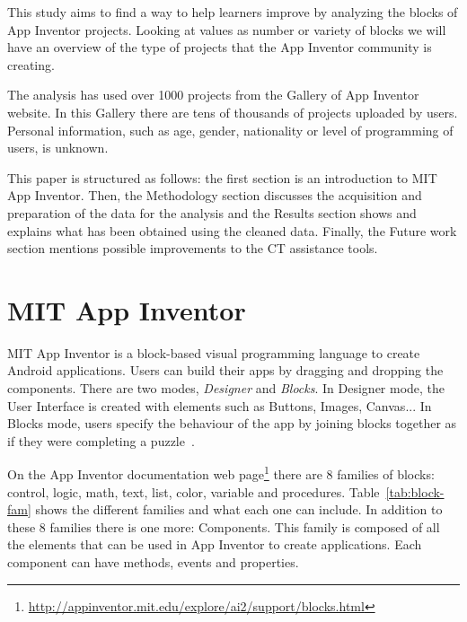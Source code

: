 \documentclass[a4paper]{article}
\begin{document}
This study aims to find a way to help learners improve by analyzing the blocks of App Inventor projects. Looking at values as number or variety of blocks we will have an overview of the type of projects that the App Inventor community is creating.

The analysis has used over 1000 projects from the Gallery of App Inventor website. In this Gallery there are tens of thousands of projects uploaded by users. Personal information, such as age, gender, nationality or level of programming of users, is unknown.

This paper is structured as follows: the first section is an introduction to MIT App Inventor. Then, the Methodology section discusses the acquisition and preparation of the data for the analysis and the Results section shows and explains what has been obtained using the cleaned data. Finally, the Future work section mentions possible improvements to the CT assistance tools.

\section{MIT App Inventor}
MIT App Inventor is a block-based visual programming language to create Android applications. Users can build their apps by dragging and dropping the components. There are two modes, \emph{Designer} and \emph{Blocks}. In Designer mode, the User Interface is created with elements such as Buttons, Images, Canvas... In Blocks mode, users specify the behaviour of the app by joining blocks together as if they were completing a puzzle~\cite{wolber2011app}.

On the App Inventor documentation web page\footnote{\url{http://appinventor.mit.edu/explore/ai2/support/blocks.html}} there are 8 families of blocks: control, logic, math, text, list, color, variable and procedures. Table~\ref{tab:block-fam} shows the different families and what each one can include. In addition to these 8 families there is one more: Components. This family is composed of all the elements that can be used in App Inventor to create applications. Each component can have methods, events and properties.
\end{document}
